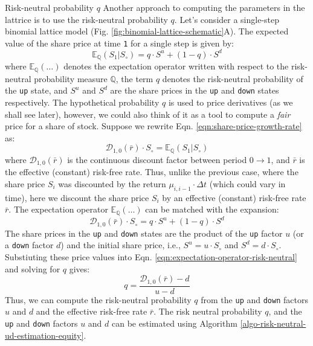 \documentclass[11pt]{article}
\makeatletter
\theoremstyle{definition}
\renewcommand\subsubsection{\@startsection
	{subsubsection}{2}{0mm}
	{-0.05in}
	{-0.5\baselineskip}
	{\normalfont\normalsize\itshape\bfseries}}
\makeatother
\begin{document}
\subsubsection{Risk-neutral probability $q$}
Another approach to computing the parameters in the lattrice is to use the risk-neutral probability $q$. 
Let's consider a single-step binomial lattice model (Fig. \ref{fig:binomial-lattice-schematic}A). 
The  expected value of the share price at time \texttt{1} for a single step is given by:
\begin{equation*}
	\mathbb{E}_{\mathbb{Q}}(S_{1} | S_{\circ}) = q\cdot{S^{u}} + (1-q)\cdot{S^{d}}
\end{equation*}
where $\mathbb{E}_{\mathbb{Q}}(\dots)$ denotes the expectation operator written with respect to the risk-neutral probability measure $\mathbb{Q}$, 
the term $q$ denotes the risk-neutral probability of the \texttt{up} state, and $S^{u}$ and $S^{d}$ are the share prices in the \texttt{up} and \texttt{down} states respectively.
The hypothetical probability $q$ is used to price derivatives (as we shall see later), 
however, we could also think of it as a tool to compute a \textit{fair} price for a share of stock.
Suppose we rewrite Eqn. \eqref{eqn:share-price-growth-rate} as:
\begin{equation}\label{eqn:share-price-growth-rate-2}
    \mathcal{D}_{1,0}(\bar{r})\cdot{S_{\circ}} = \mathbb{E}_{\mathbb{Q}}\left(S_{1}|S_{\circ}\right)
\end{equation}
where $\mathcal{D}_{1,0}(\bar{r})$ is the continuous discount factor between period $0\rightarrow{1}$, 
and $\bar{r}$ is the effective (constant) risk-free rate. Thus, unlike the previous case, where the share price $S_{i}$ was discounted by the
return $\mu_{i,i-1}\cdot\Delta{t}$ (which could vary in time), here we discount the share price $S_{i}$ by an effective (constant) risk-free rate $\bar{r}$.
The expectation operator $\mathbb{E}_{\mathbb{Q}}(\dots)$ can be matched with the expansion:
\begin{equation}\label{eqn:expectation-operator-risk-neutral}
\mathcal{D}_{1,0}(\bar{r})\cdot{S_{\circ}} = q\cdot{S^{u}} + (1-q)\cdot{S^{d}}
\end{equation}
The share prices in the \texttt{up} and \texttt{down} states are the product of the \texttt{up} factor $u$ (or a \texttt{down} factor $d$) and the initial share price, 
i.e., $S^{u} = u\cdot{S_{\circ}}$ and $S^{d} = d\cdot{S_{\circ}}$. Substiuting these price values into Eqn. \eqref{eqn:expectation-operator-risk-neutral} and solving for $q$ gives:
\begin{equation}\label{eqn:risk-neutral-probability}
q = \frac{\mathcal{D}_{1,0}(\bar{r}) - d}{u - d}
\end{equation}
Thus, we can compute the risk-neutral probability $q$ from the \texttt{up} and \texttt{down} factors $u$ and $d$ 
and the effective risk-free rate $\bar{r}$. The risk neutral probability $q$, and the \texttt{up} and \texttt{down} factors $u$ and $d$ 
can be estimated using Algorithm \ref{algo-risk-neutral-ud-estimation-equity}.
\end{document}
